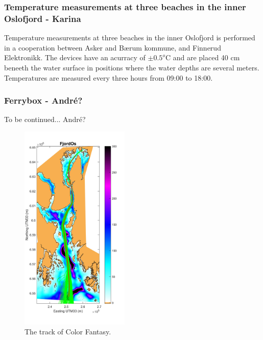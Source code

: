 \documentclass[12pt,a4paper,english]{article}
\begin{document}
\clearpage

\subsubsection{Temperature measurements at three beaches in the inner Oslofjord - Karina}

Temperature measurements at three beaches in the inner Oslofjord is performed in a cooperation between Asker and B\ae rum kommune, and Finnerud Elektronikk.  The devices have an acurracy of $\pm 0.5^o$C and are placed 40 cm beneeth the water surface in positions where the water depths are several meters. Temperatures are measured every three hours from 09:00 to 18:00. 

 




\subsubsection{Ferrybox - Andr\'{e}?}
To be continued... Andr\'{e}?

\begin{figure}[ht]
\centerline{
\includegraphics*[trim=1cm 0cm 1cm 0cm,clip=true,height=10cm]{Figurer/FjordOs_with_FA_track}}
\caption{\small
The track of Color Fantasy.}
\label{fig:Ferrybox_track}
\end{figure}
\end{document}

